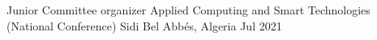 

\begin{cvhonors}

  \cvhonor
    {Junior Committee organizer } %
    {Applied Computing and Smart Technologies (National Conference)} %
    {Sidi Bel Abbés, Algeria} %
    {Jul 2021} %



\end{cvhonors}
